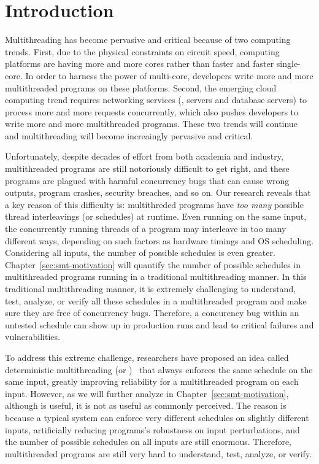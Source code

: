 \chapter{Introduction} \label{sec:intro}

Multithreading has become pervasive and critical because of two computing
trends. First, due to the physical constraints on circuit speed, computing
platforms are having more and more cores rather than faster and faster
single-core. In order to harness the power of multi-core, developers write more
and more multithreaded programs on these platforms. Second, the emerging cloud
computing trend requires networking services (\eg, \http servers and database
servers) to process more and more requests concurrently, which also pushes
developers to write more and more multithreaded programs. These two trends will
continue and multithreading will become increaingly pervasive and critical.

Unfortunately, despite decades of effort from both academia and industry,
multithreaded programs are still notoriously difficult to get right, and these
programs are plagued with harmful concurrency bugs that can cause wrong outputs,
program crashes, security breaches, and so on. Our research reveals that a key
reason of this difficulty is: multithreded programs have \emph{too many}
possible thread interleavings (or schedules) at runtime. Even running on the
same input, the concurrently running threads of a program may interleave in too
many different ways, depending on such factors as hardware timings and OS
scheduling. Considering all inputs, the number of possible schedules is even
greater. Chapter~\ref{sec:smt-motivation} will quantify the number of
possible schedules in multithreaded programs running in a traditional
multithreading manner. In this traditional multithreading manner, it is
extremely challenging to understand, test, analyze, or verify all these
schedules in a multithreaded program and make sure they are free of concurrency
bugs. Therefore, a concurency bug within an untested schedule can show up in
production runs and lead to critical failures and vulnerabilities.

To address this extreme challenge, researchers have proposed an idea called
deterministic multithreading (or \dmt)~\cite{dthreads:sosp11, dpj:oopsla09,
dmp:asplos09, kendo:asplos09, coredet:asplos10} that always enforces the same
schedule on the same input, greatly improving reliability for a multithreaded
program on each input. However, as we will further analyze in
Chapter~\ref{sec:smt-motivation}, although \dmt is useful, it is not as useful
as commonly perceived. The reason is because a typical \dmt system can enforce
very different schedules on slightly different inputs, artificially reducing
programs's robustness on input perturbations, and the number of possible
schedules on all inputs are still enormous. Therefore, multithreaded programs
are still very hard to understand, test, analyze, or verify.

